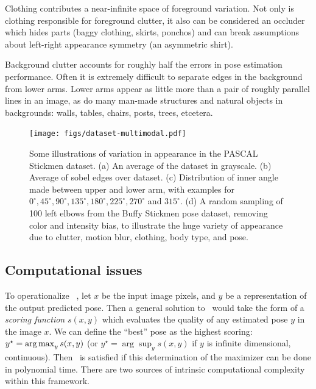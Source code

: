  Clothing contributes a near-infinite space of foreground 
variation.  Not only is clothing responsible for foreground clutter, it also 
can be considered an occluder which hides parts (\eg baggy clothing, skirts, 
ponchos) and can break assumptions about left-right appearance symmetry (\eg an 
asymmetric shirt).

 Background clutter accounts for roughly half the 
errors in pose estimation performance. Often it is extremely difficult to 
separate edges in the background from lower arms.  Lower arms appear as little 
more than a pair of roughly parallel lines in an image, as do many man-made 
structures and natural objects in backgrounds: walls, tables, chairs, posts, 
trees, etcetera.

\begin{figure}[tb]
\begin{center}
\texttt{[image: figs/dataset-multimodal.pdf]}
\caption[Variations in appearance]{Some illustrations of variation in 
appearance in the PASCAL Stickmen dataset.  (a) An average of the dataset in 
grayscale.  (b) Average of sobel edges over dataset.  (c) Distribution of inner 
angle made between upper and lower arm, with examples for 
$0^\circ,45^\circ,90^\circ,135^\circ,180^\circ,225^\circ,270^\circ$ and 
$315^\circ$. (d) A random sampling of 100 left elbows from the Buffy Stickmen 
pose dataset,	removing color and intensity bias, to illustrate the huge variety 
of appearance due to	clutter, motion blur, clothing, body type, and pose.  
\label{fig:dataset-multimodal}}
\end{center}
\end{figure}



\subsection{Computational issues}

To operationalize ~, let $x$ be the input image pixels, and $y$ 
be a representation of the output predicted pose.  Then a general solution 
to~ would take the form of a {\em scoring function} $s(x,y)$ 
which evaluates the quality of any estimated pose $y$ in the image $x$.  We can 
define the ``best'' pose as the highest scoring: $y^\star = \mathop{\arg\max}_y s(x,y)$ 
(or $y^\star = \arg\sup_y s(x,y)$ if $y$ is infinite dimensional, \eg 
continuous).  Then~ is satisfied if this determination of the 
maximizer can be done in polynomial time. There are two sources of intrinsic 
computational complexity within this framework. 

